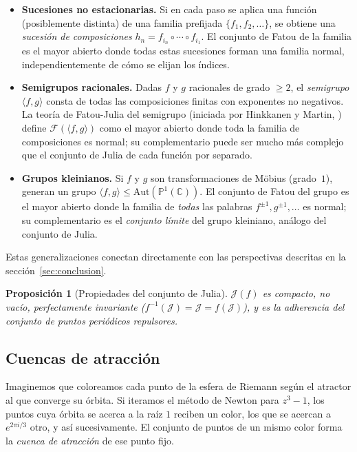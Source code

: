 \documentclass[11pt,a4paper]{article}
\theoremstyle{plain}
\newtheorem{proposicion}[teorema]{Proposición}
\theoremstyle{definition}
\theoremstyle{remark}
\newcommand{\Puno}{\mathbb{P}^1(\mathbb{C})}
\begin{document}
\begin{itemize}
  \item \textbf{Sucesiones no estacionarias.}
        Si en cada paso se aplica una función (posiblemente distinta) de
        una familia prefijada $\{f_1,f_2,\ldots\}$, se obtiene una
        \emph{sucesión de composiciones}
        $h_n = f_{i_n}\circ\cdots\circ f_{i_1}$.
        El conjunto de Fatou de la familia es el mayor abierto donde
        todas estas sucesiones forman una familia normal,
        independientemente de cómo se elijan los índices.
  \item \textbf{Semigrupos racionales.}
        Dadas $f$ y $g$ racionales de grado $\geq 2$, el
        \emph{semigrupo} $\langle f,g\rangle$ consta de todas las
        composiciones finitas con exponentes no negativos.
        La teoría de Fatou-Julia del semigrupo (iniciada por
        Hinkkanen y Martin, \cite{HinkkanenMartin1996}) define $\mathcal{F}(\langle f,g\rangle)$
        como el mayor abierto donde toda la familia de composiciones
        es normal; su complementario puede ser mucho más complejo
        que el conjunto de  Julia de cada función por separado.
  \item \textbf{Grupos kleinianos.}
        Si $f$ y $g$ son transformaciones de Möbius (grado~$1$),
        generan un grupo $\langle f,g\rangle\leq\mathrm{Aut}(\Puno)$.
        El conjunto de Fatou del grupo es el mayor abierto donde la
        familia de \emph{todas} las palabras $f^{\pm 1},g^{\pm 1},\ldots$
        es normal; su complementario es el \emph{conjunto límite}
        del grupo kleiniano, análogo del conjunto de Julia.
\end{itemize}

Estas generalizaciones conectan directamente con las perspectivas
descritas en la sección~\ref{sec:conclusion}.

\begin{proposicion}[Propiedades del conjunto de Julia]
$\mathcal{J}(f)$ es compacto, no vacío, perfectamente invariante
($f^{-1}(\mathcal{J})=\mathcal{J}=f(\mathcal{J})$), y es la
adherencia del conjunto de puntos periódicos repulsores.
\end{proposicion}

\subsection{Cuencas de atracción}

Imaginemos que coloreamos cada punto de la esfera de Riemann según el atractor al que
converge su órbita. Si iteramos el método de Newton para $z^3-1$, los puntos cuya órbita
se acerca a la raíz $1$ reciben un color, los que se acercan a $e^{2\pi i/3}$ otro, y así
sucesivamente. El conjunto de puntos de un mismo color forma la \emph{cuenca de atracción}
de ese punto fijo.
\end{document}
